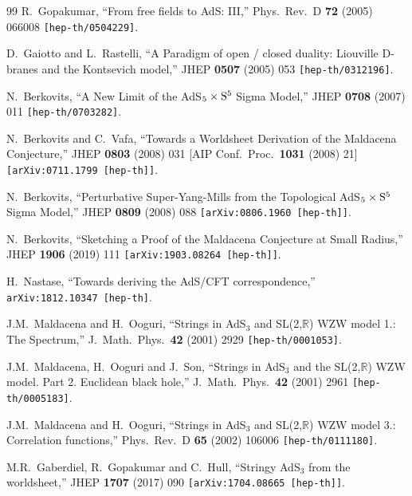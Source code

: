 \documentclass[12pt,a4paper]{article}
\begin{document}
\begin{thebibliography}{99}
R.~Gopakumar,
``From free fields to AdS: III,''
Phys.\ Rev.\ D {\bf 72} (2005) 066008 
{\tt  [hep-th/0504229]}.

D.~Gaiotto and L.~Rastelli,
``A Paradigm of open / closed duality: Liouville D-branes and the Kontsevich model,''
JHEP {\bf 0507} (2005) 053 
{\tt [hep-th/0312196]}.
 
N.~Berkovits,
``A New Limit of the AdS$_5 \times {\rm S}^5$ Sigma Model,''
JHEP {\bf 0708} (2007) 011 
{\tt [hep-th/0703282]}. 
  
N.~Berkovits and C.~Vafa,
``Towards a Worldsheet Derivation of the Maldacena Conjecture,''
JHEP {\bf 0803} (2008) 031 
[AIP Conf.\ Proc.\  {\bf 1031} (2008) 21]
{\tt [arXiv:0711.1799 [hep-th]]}.
  
N.~Berkovits,
``Perturbative Super-Yang-Mills from the Topological AdS$_5 \times {\rm S}^5$ Sigma Model,''
JHEP {\bf 0809} (2008) 088 
{\tt  [arXiv:0806.1960 [hep-th]]}. 

N.~Berkovits,
``Sketching a Proof of the Maldacena Conjecture at Small Radius,''
JHEP {\bf 1906} (2019) 111 
{\tt [arXiv:1903.08264 [hep-th]]}.  
 
H.~Nastase,
``Towards deriving the AdS/CFT correspondence,''
{\tt arXiv:1812.10347 [hep-th]}.

J.M.~Maldacena and H.~Ooguri,
``Strings in AdS$_3$ and SL(2,$\mathbb{R}$) WZW model 1.: The Spectrum,''
J.\ Math.\ Phys.\  {\bf 42} (2001) 2929
{\tt [hep-th/0001053]}.

J.M.~Maldacena, H.~Ooguri and J.~Son,
``Strings in AdS$_3$ and the SL(2,$\mathbb{R}$) WZW model. Part 2. Euclidean black hole,''
J.\ Math.\ Phys.\  {\bf 42} (2001) 2961
{\tt [hep-th/0005183]}.

J.M.~Maldacena and H.~Ooguri,
``Strings in AdS$_3$ and SL(2,$\mathbb{R}$) WZW model 3.: Correlation functions,''
Phys.\ Rev.\ D {\bf 65} (2002) 106006
{\tt [hep-th/0111180]}.

M.R.~Gaberdiel, R.~Gopakumar and C.~Hull,
``Stringy AdS$_{3}$ from the worldsheet,''
JHEP {\bf 1707} (2017) 090
{\tt [arXiv:1704.08665 [hep-th]]}.  


\end{thebibliography}
\end{document}
